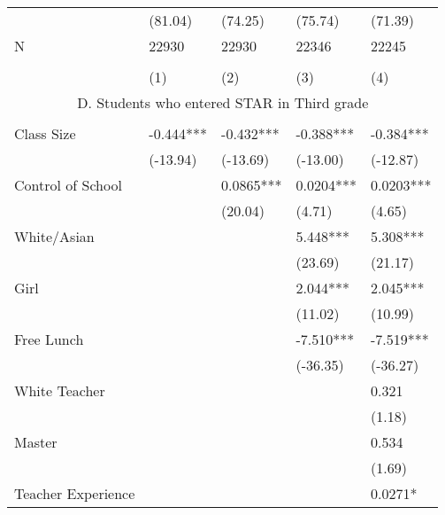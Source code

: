 \documentclass{article}
\begin{document}
\begin{table}[htbp]
\begin{tabular}{lllrr}
          & (81.04) & (74.25) & \multicolumn{1}{l}{(75.74)} & \multicolumn{1}{l}{(71.39)} \\
    N     & 22930 & 22930 & \multicolumn{1}{l}{22346} & \multicolumn{1}{l}{22245} \\
          &       &       &       &  \\
          & (1)   & (2)   & \multicolumn{1}{l}{(3)} & \multicolumn{1}{l}{(4)} \\
    \midrule
    \multicolumn{5}{c}{D. Students who entered STAR in Third grade} \\
          &       &       &       &  \\
    Class Size & -0.444*** & -0.432*** & \multicolumn{1}{l}{-0.388***} & \multicolumn{1}{l}{-0.384***} \\
          & (-13.94) & (-13.69) & \multicolumn{1}{l}{(-13.00)} & \multicolumn{1}{l}{(-12.87)} \\
    Control of School &       & 0.0865*** & \multicolumn{1}{l}{0.0204***} & \multicolumn{1}{l}{0.0203***} \\
          &       & (20.04) & \multicolumn{1}{l}{(4.71)} & \multicolumn{1}{l}{(4.65)} \\
    White/Asian &       &       & \multicolumn{1}{l}{5.448***} & \multicolumn{1}{l}{5.308***} \\
          &       &       & \multicolumn{1}{l}{(23.69)} & \multicolumn{1}{l}{(21.17)} \\
    Girl  &       &       & \multicolumn{1}{l}{2.044***} & \multicolumn{1}{l}{2.045***} \\
          &       &       & \multicolumn{1}{l}{(11.02)} & \multicolumn{1}{l}{(10.99)} \\
    Free Lunch &       &       & \multicolumn{1}{l}{-7.510***} & \multicolumn{1}{l}{-7.519***} \\
          &       &       & \multicolumn{1}{l}{(-36.35)} & \multicolumn{1}{l}{(-36.27)} \\
    White Teacher &       &       & \multicolumn{1}{l}{} & \multicolumn{1}{l}{0.321} \\
          &       &       & \multicolumn{1}{l}{} & \multicolumn{1}{l}{(1.18)} \\
    Master &       &       & \multicolumn{1}{l}{} & \multicolumn{1}{l}{0.534} \\
          &       &       & \multicolumn{1}{l}{} & \multicolumn{1}{l}{(1.69)} \\
    Teacher Experience &       &       & \multicolumn{1}{l}{} & \multicolumn{1}{l}{0.0271*} \\

\end{tabular}
\end{table}
\end{document}
